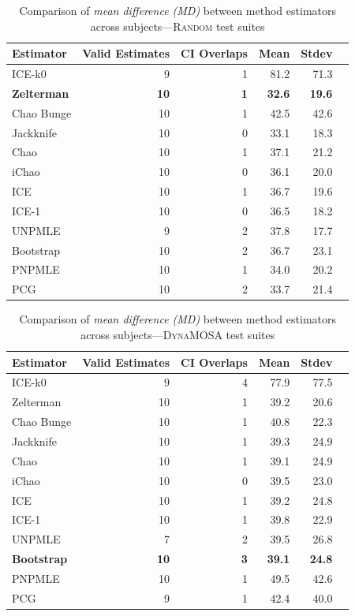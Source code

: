 \documentclass[sigconf,review,anonymous]{acmart}
\newcommand{\ICEallrare}{ICE-k0\xspace}
\newcommand{\Zelterman}{Zelterman\xspace}
\newcommand{\ChaoBunge}{Chao Bunge\xspace}
\newcommand{\Jackknife}{Jackknife\xspace}
\newcommand{\Chao}{Chao\xspace}
\newcommand{\improvedChao}{iChao\xspace}
\newcommand{\ICE}{ICE\xspace}
\newcommand{\improvedICE}{ICE-1\xspace}
\newcommand{\Unpmle}{UNPMLE\xspace}
\newcommand{\Bootstrap}{Bootstrap\xspace}
\newcommand{\Pnpmle}{PNPMLE\xspace}
\newcommand{\PCG}{PCG\xspace}
\newcommand{\EvosuiteRandom}{\textsc{Random}\xspace}
\newcommand{\EvosuiteDynamosa}{\textsc{DynaMOSA}\xspace}
\newcommand{\B}[1]{\textbf{#1}}
\begin{document}
\begin{table}
\caption{Comparison of \emph{mean difference (MD)} between method
estimators across subjects---\EvosuiteRandom test suites}
\begin{tabular}{|l|r|r|r|r|r|}
\hline
Estimator	&Valid Estimates	&CI Overlaps	&Mean	&Stdev	\\
\hline
\ICEallrare	&	9	&	1	&81.2	&	71.3\\
\B{\Zelterman}	&	\B{10}	&	\B{1}	&\B{32.6}	&	\B{19.6}\\
\ChaoBunge	&	10	&	1	&42.5	&	42.6\\
\Jackknife	&	10	&	0	&33.1	&	18.3\\
\Chao	&	10	&	1	&37.1	&	21.2\\
\improvedChao	&	10	&	0	&36.1	&	20.0\\
\ICE	&	10	&	1	&36.7	&	19.6\\
\improvedICE	&	10	&	0	&36.5	&	18.2\\
\Unpmle	&	9	&	2	&37.8	&	17.7\\
\Bootstrap	&	10	&	2	&36.7	&	23.1\\
\Pnpmle	&	10	&	1	&34.0	&	20.2\\
\PCG	&	10	&	2	&33.7	&	21.4\\
\hline
\end{tabular}
\label{tbl:estrandom}
\end{table}
%
\begin{table}
\caption{Comparison of \emph{mean difference (MD)} between method
estimators across subjects---\EvosuiteDynamosa test suites}
\begin{tabular}{|l|r|r|r|r|r|}
\hline
Estimator	&Valid Estimates	&CI Overlaps	&Mean	&Stdev	\\
\hline
\ICEallrare	&	9	&	4	&77.9	&	77.5\\
\Zelterman	&	10	&	1	&39.2	&	20.6\\
\ChaoBunge	&	10	&	1	&40.8	&	22.3\\
\Jackknife	&	10	&	1	&39.3	&	24.9\\
\Chao	&	10	&	1	&39.1	&	24.9\\
\improvedChao	&	10	&	0	&39.5	&	23.0\\
\ICE	&	10	&	1	&39.2	&	24.8\\
\improvedICE	&	10	&	1	&39.8	&	22.9\\
\Unpmle	&	7	&	2	&39.5	&	26.8\\
\B{\Bootstrap}	&	\B{10}	&	\B{3}	&\B{39.1}	&	\B{24.8}\\
\Pnpmle	&	10	&	1	&49.5	&	42.6\\
\PCG	&	9	&	1	&42.4	&	40.0\\
\hline
\end{tabular}
\label{tbl:estdynamosa}
\end{table}
%
\end{document}
